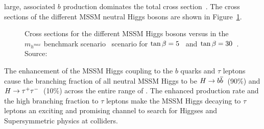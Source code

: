 large, associated $b$ production dominates the total cross
section~\cite{LHCHiggsXSecGroup}. The cross sections of the different MSSM
neutral Higgs bosons are shown in Figure~\ref{fig:MSSMXSectionsTanBeta}.
\begin{figure}
  \centering
  \caption[MSSM Higgs cross sections at the LHC]{Cross sections for the
  different MSSM Higgs bosons versus \ma in the $m_{h^{max}}$ benchmark
  scenario~\cite{MHMaxBenchmark} scenario for
  $\tan\beta=5$~ and
  $\tan\beta=30$~.  Source:~\cite{LHCHiggsXSecGroup}
  }
  \label{fig:MSSMXSectionsTanBeta}
\end{figure}
The \tanb enhancement of the MSSM Higgs coupling to the $b$ quarks and $\tau$
leptons cause the branching fraction of all neutral MSSM Higgs to be
$H\to{b\overline{b}}$~(90\%) and $H\to\tau^+\tau^-$~(10\%) across the entire range of \ma.  The
enhanced production rate and the high branching fraction to $\tau$ leptons make
the MSSM Higgs decaying to $\tau$ leptons an exciting and promising channel to
search for Higgses and Supersymmetric physics at colliders.

